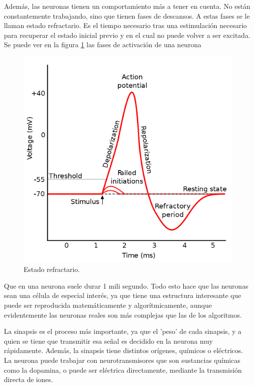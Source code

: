 \documentclass[12pt]{article}
\numberwithin{equation}{section}
\begin{document}
{Además, las neuronas tienen un comportamiento más a tener en cuenta. No están constantemente trabajando, sino que tienen fases de descansos. A estas fases se le llaman estado refractario. Es el tiempo necesario tras una estimulación necesario para recuperar el estado inicial previo y en el cual no puede volver a ser excitada. Se puede ver en la figura \ref{fig:refractario} las fases de activación de una neurona
\begin{figure}[h]
    \centering
    \includegraphics[scale=0.2]{refractorystate.png}
    \caption{Estado refractario.}
    \label{fig:refractario}
\end{figure}

Que en una neurona suele durar 1 mili segundo. Todo esto hace que las neuronas sean una célula de especial interés, ya que tiene una estructura interesante que puede ser reproducida matemáticamente y algorítmicamente, aunque evidentemente las neuronas reales son más complejas que las de los algoritmos.

La sinapsis es el proceso más importante, ya que el 'peso' de cada sinapsis, y a quien se tiene que transmitir esa señal es decidido en la neurona muy rápidamente. Además, la sinapsis tiene distintos orígenes, químicos o eléctricos. La neurona puede trabajar con neurotransmisores que son sustancias químicas como la dopamina, o puede ser eléctrica directamente, mediante la transmisión directa de iones.	

}
\end{document}

